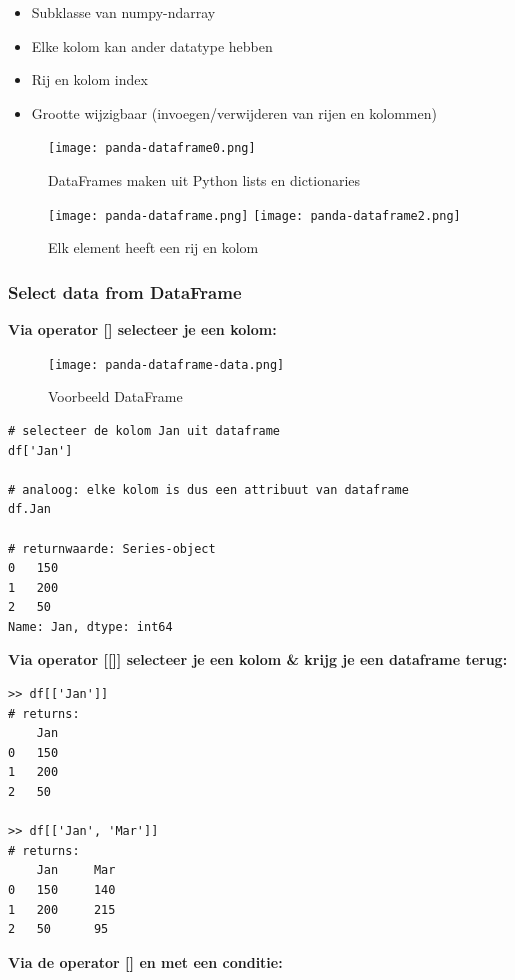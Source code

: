 \documentclass{article}
\begin{document}
\begin{itemize}
    \item Subklasse van numpy-ndarray
    \item Elke kolom kan ander datatype hebben
    \item Rij en kolom index
    \item Grootte wijzigbaar (invoegen/verwijderen van rijen en kolommen)
\end{itemize}

\begin{figure}[H]
    \centering
    \texttt{[image: panda-dataframe0.png]}
    \caption{DataFrames maken uit Python lists en dictionaries}
\end{figure}


\begin{figure}[H]
    \centering
    \texttt{[image: panda-dataframe.png]}
    \texttt{[image: panda-dataframe2.png]}
    \caption{Elk element heeft een rij en kolom}
\end{figure}


\subsubsection{Select data from DataFrame}

\textbf{Via operator [] selecteer je een kolom:}

\begin{figure}[H]
    \centering
    \texttt{[image: panda-dataframe-data.png]}
    \caption{Voorbeeld DataFrame}
\end{figure}


\begin{verbatim}
# selecteer de kolom Jan uit dataframe
df['Jan']

# analoog: elke kolom is dus een attribuut van dataframe
df.Jan

# returnwaarde: Series-object
0   150
1   200
2   50
Name: Jan, dtype: int64
\end{verbatim}

\textbf{Via operator [[]] selecteer je een kolom \& krijg je een dataframe terug:}

\begin{verbatim}
>> df[['Jan']]
# returns:
    Jan
0   150
1   200
2   50

>> df[['Jan', 'Mar']]
# returns:
    Jan     Mar
0   150     140
1   200     215
2   50      95
\end{verbatim}

\textbf{Via de operator [] en met een conditie:}
\end{document}
